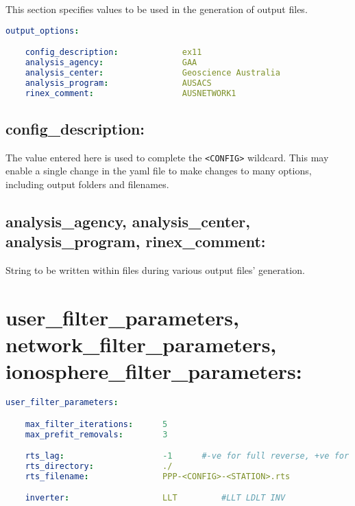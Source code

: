 This section specifies values to be used in the generation of output files.

\begin{lstlisting}[language=yaml,caption=output\_options:]
output_options:

    config_description:             ex11
    analysis_agency:                GAA
    analysis_center:                Geoscience Australia
    analysis_program:               AUSACS
    rinex_comment:                  AUSNETWORK1
\end{lstlisting}

\subsection*{config\_description:}

The value entered here is used to complete the \verb|<CONFIG>| wildcard.
This may enable a single change in the yaml file to make changes to many options, including output folders and filenames.

\subsection*{analysis\_agency, analysis\_center, analysis\_program, rinex\_comment:}

String to be written within files during various output files' generation.








\section{user\_filter\_parameters, network\_filter\_parameters, ionosphere\_filter\_parameters:}


\begin{lstlisting}[language=yaml,caption=Kalman Filter Configuration]
user_filter_parameters:

    max_filter_iterations:      5
    max_prefit_removals:        3

    rts_lag:                    -1      #-ve for full reverse, +ve for limited epochs
    rts_directory:              ./
    rts_filename:               PPP-<CONFIG>-<STATION>.rts

    inverter:                   LLT         #LLT LDLT INV

\end{lstlisting}

